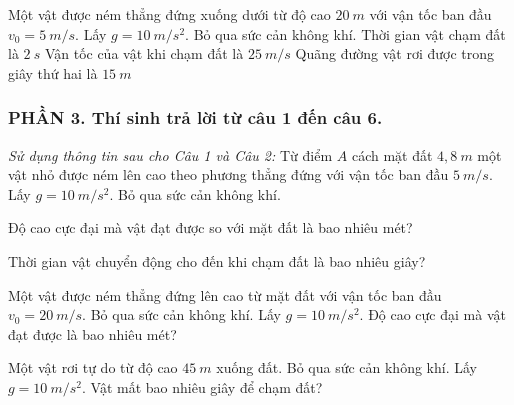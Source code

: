 \begin{ex}%
Một vật được ném thẳng đứng xuống dưới từ độ cao $20\ m$ với vận tốc ban đầu $v_0 = 5\ m/s$. Lấy $g = 10\ m/s^2$. Bỏ qua sức cản không khí.
{Thời gian vật chạm đất là $2\ s$} 
{Vận tốc của vật khi chạm đất là $25\ m/s$}
{Quãng đường vật rơi được trong giây thứ hai là $15\ m$}
\end{ex}
\subsubsection*{PHẦN 3. Thí sinh trả lời từ câu 1 đến câu 6.}
\setcounter{ex}{0} 
\textit{Sử dụng thông tin sau cho Câu 1 và Câu 2:} Từ điểm $A$ cách mặt đất $4,8\ m$ một vật nhỏ được ném lên cao theo phương thẳng đứng với vận tốc ban đầu $5\ m/s$. Lấy $g=10\ m/s^2$. Bỏ qua sức cản không khí.
\begin{ex}%
Độ cao cực đại mà vật đạt được so với mặt đất là bao nhiêu mét?
\loigiai{}
\end{ex}
\begin{ex}%
 Thời gian vật chuyển động cho đến khi chạm đất là bao nhiêu giây?
\end{ex}
\begin{ex}
Một vật được ném thẳng đứng lên cao từ mặt đất với vận tốc ban đầu $v_0 = 20\ m/s$. Bỏ qua sức cản không khí. Lấy $g = 10\ m/s^2$. Độ cao cực đại mà vật đạt được là bao nhiêu mét?
\end{ex}

\begin{ex}
Một vật rơi tự do từ độ cao $45\ m$ xuống đất. Bỏ qua sức cản không khí. Lấy $g = 10\ m/s^2$. Vật mất bao nhiêu giây để chạm đất?
\end{ex}

